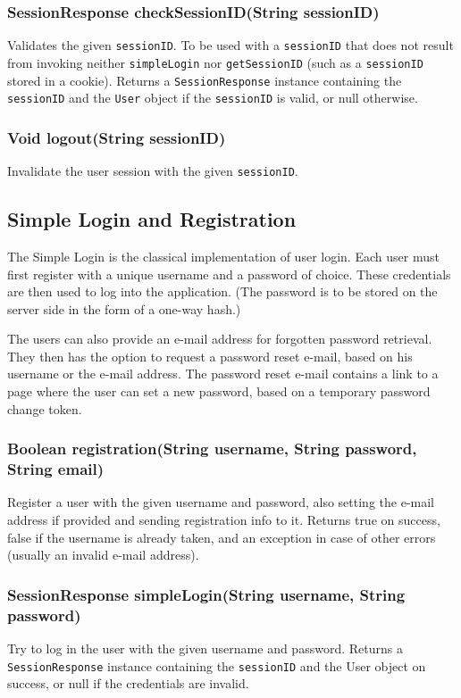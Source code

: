 {\subsubsection{SessionResponse checkSessionID(String sessionID)}
Validates the given {\tt sessionID}. To be used with a {\tt sessionID} that does not result from invoking neither {\tt simpleLogin} nor {\tt getSessionID} (such as a {\tt sessionID} stored in a cookie).
Returns a {\tt SessionResponse} instance containing the {\tt sessionID} and the {\tt User} object if the {\tt sessionID} is valid, or null otherwise.

\subsubsection{Void logout(String sessionID)}
Invalidate the user session with the given {\tt sessionID}.

\subsection{Simple Login and Registration}
\label{subsec:simple_login}

The Simple Login is the classical implementation of user login. Each user must first register with a unique username and a password of choice. These credentials are then used to log into the application. (The password is to be stored on the server side in the form of a one-way hash.)

The users can also provide an e-mail address for forgotten password retrieval. They then has the option to request a password reset e-mail, based on his username or the e-mail address. The password reset e-mail contains a link to a page where the user can set a new password, based on a temporary password change token.

\subsubsection{Boolean registration(String username, String password, String email)}
Register a user with the given username and password, also setting the e-mail address if provided and sending registration info to it.
Returns true on success, false if the username is already taken, and an exception in case of other errors (usually an invalid e-mail address).

\subsubsection{SessionResponse simpleLogin(String username, String password)}
Try to log in the user with the given username and password.
Returns a {\tt SessionResponse} instance containing the {\tt sessionID} and the User object on success, or null if the credentials are invalid.

}
